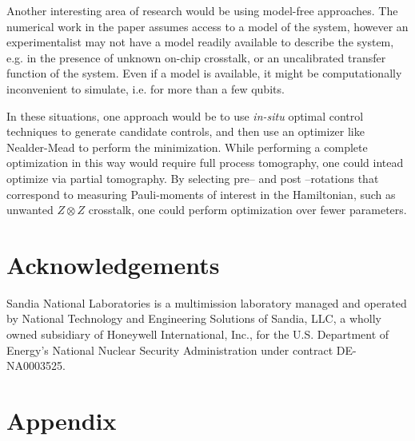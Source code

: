 \documentclass[aps,nofootinbib,pra,notitlepage,twocolumn]{revtex4-1}
\begin{document}
Another interesting area of research would be using model-free approaches. The numerical work in the paper assumes access to a model of the system, however an experimentalist may not have a model readily available to describe the system, e.g. in the presence of unknown on-chip crosstalk, or an uncalibrated transfer function of the system. Even if a model is available, it might be computationally inconvenient to simulate, i.e. for more than a few qubits.

In these situations, one approach would be to use \textit{in-situ} optimal control techniques \cite{Wu2018, Kelly2014, Ferrie2015} to generate candidate controls, and then use an optimizer like Nealder-Mead to perform the minimization. While performing a complete optimization in this way would require full process tomography, one could intead optimize via partial tomography. By selecting pre-- and post --rotations that correspond to measuring Pauli-moments of interest in the Hamiltonian, such as unwanted $Z\otimes Z$ crosstalk, one could perform optimization over fewer parameters.

\section{Acknowledgements}
\label{sec:acknowledgements}
Sandia National Laboratories is a multimission laboratory managed and operated by National Technology and Engineering Solutions of Sandia, LLC, a wholly owned subsidiary of Honeywell International, Inc., for the U.S. Department of Energy's National Nuclear Security Administration under contract DE-NA0003525.



\newpage
\onecolumngrid
\section{Appendix}
\label{sec:appendix}
\end{document}
